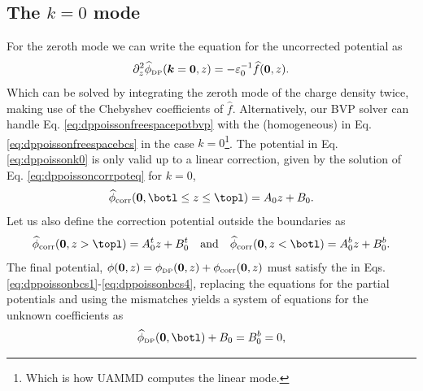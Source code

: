 \documentclass[twoside,openright,titlepage,numbers=noenddot,%
headinclude,footinclude,cleardoublepage=empty,abstract=on,
BCOR=5mm,fontsize=11pt, dvipsnames, paper=b5
]{scrreprt}
\renewcommand{\vec}[1]{\bm{#1}}
\newcommand{\uammd}{\gls{UAMMD}\xspace}
\newcommand{\fou}[1]{\widehat{#1}}
\newcommand{\corr}{\text{corr}}
\newcommand{\dpr}{\text{\tiny DP}}
\begin{document}
\subsection{The $k=0$ mode}\label{sec:dpelectroneutral}
For the zeroth mode we can write the equation for the uncorrected potential as
\begin{equation}
  \label{eq:dppoissonk0}
  \partial_z ^2\fou{\phi}_{\dpr}(\vec{k}=\vec{0}, z) = -  \varepsilon_0^{-1}\fou{f}(\vec{0}, z).
\end{equation}
Which can be solved by integrating the zeroth mode of the charge density twice, making use of the Chebyshev coefficients of $\fou{f}$. Alternatively, our \gls{BVP} solver can handle Eq. \eqref{eq:dppoissonfreespacepotbvp} with the (homogeneous) \bcs in Eq. \eqref{eq:dppoissonfreespacebcs} in the case $k=0$\footnote{Which is how \uammd computes the linear mode.}.
The potential in Eq. \eqref{eq:dppoissonk0} is only valid up to a linear correction, given by the solution of Eq. \eqref{eq:dppoissoncorrpoteq} for $k=0$,
\begin{equation}
  \fou{\phi}_{\corr}(\vec{0}, \botl\le z\le \topl) = A_0z + B_0.
\end{equation}
Let us also define the correction potential outside the boundaries as
\begin{equation}
  \fou{\phi}_{\corr}(\vec{0}, z> \topl) = A^t_0z + B^t_0 \quad\text{and}\quad \fou{\phi}_{\corr}(\vec{0}, z<\botl) = A^b_0z + B^b_0.
\end{equation}
The final potential, $\phi(\vec{0},z) = \phi_{\dpr}(\vec{0},z) + \phi_{\corr}(\vec{0},z)$ must satisfy the \bcs in Eqs. \eqref{eq:dppoissonbcs1}-\eqref{eq:dppoissonbcs4}, replacing the equations for the partial potentials and using the mismatches yields a system of equations for the unknown coefficients as
\begin{equation}
  \label{eq:dppoissonB0}
  \fou{\phi}_{\dpr}(\vec{0}, \botl) + B_0 = B_0^b = 0,
\end{equation}
\end{document}
